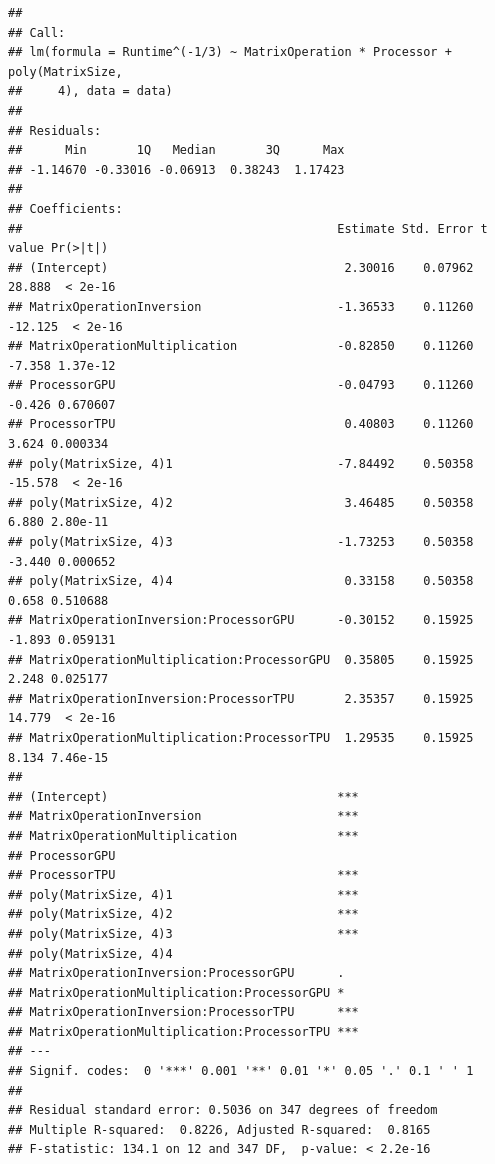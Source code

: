 \documentclass[
]{article}
\newenvironment{Shaded}{\begin{snugshade}}{\end{snugshade}}
\newcommand{\DataTypeTok}[1]{\textcolor[rgb]{0.13,0.29,0.53}{#1}}
\newcommand{\DecValTok}[1]{\textcolor[rgb]{0.00,0.00,0.81}{#1}}
\newcommand{\KeywordTok}[1]{\textcolor[rgb]{0.13,0.29,0.53}{\textbf{#1}}}
\newcommand{\NormalTok}[1]{#1}
\newcommand{\OperatorTok}[1]{\textcolor[rgb]{0.81,0.36,0.00}{\textbf{#1}}}
\newcommand{\StringTok}[1]{\textcolor[rgb]{0.31,0.60,0.02}{#1}}
\begin{document}
\begin{verbatim}
## 
## Call:
## lm(formula = Runtime^(-1/3) ~ MatrixOperation * Processor + poly(MatrixSize, 
##     4), data = data)
## 
## Residuals:
##      Min       1Q   Median       3Q      Max 
## -1.14670 -0.33016 -0.06913  0.38243  1.17423 
## 
## Coefficients:
##                                            Estimate Std. Error t value Pr(>|t|)
## (Intercept)                                 2.30016    0.07962  28.888  < 2e-16
## MatrixOperationInversion                   -1.36533    0.11260 -12.125  < 2e-16
## MatrixOperationMultiplication              -0.82850    0.11260  -7.358 1.37e-12
## ProcessorGPU                               -0.04793    0.11260  -0.426 0.670607
## ProcessorTPU                                0.40803    0.11260   3.624 0.000334
## poly(MatrixSize, 4)1                       -7.84492    0.50358 -15.578  < 2e-16
## poly(MatrixSize, 4)2                        3.46485    0.50358   6.880 2.80e-11
## poly(MatrixSize, 4)3                       -1.73253    0.50358  -3.440 0.000652
## poly(MatrixSize, 4)4                        0.33158    0.50358   0.658 0.510688
## MatrixOperationInversion:ProcessorGPU      -0.30152    0.15925  -1.893 0.059131
## MatrixOperationMultiplication:ProcessorGPU  0.35805    0.15925   2.248 0.025177
## MatrixOperationInversion:ProcessorTPU       2.35357    0.15925  14.779  < 2e-16
## MatrixOperationMultiplication:ProcessorTPU  1.29535    0.15925   8.134 7.46e-15
##                                               
## (Intercept)                                ***
## MatrixOperationInversion                   ***
## MatrixOperationMultiplication              ***
## ProcessorGPU                                  
## ProcessorTPU                               ***
## poly(MatrixSize, 4)1                       ***
## poly(MatrixSize, 4)2                       ***
## poly(MatrixSize, 4)3                       ***
## poly(MatrixSize, 4)4                          
## MatrixOperationInversion:ProcessorGPU      .  
## MatrixOperationMultiplication:ProcessorGPU *  
## MatrixOperationInversion:ProcessorTPU      ***
## MatrixOperationMultiplication:ProcessorTPU ***
## ---
## Signif. codes:  0 '***' 0.001 '**' 0.01 '*' 0.05 '.' 0.1 ' ' 1
## 
## Residual standard error: 0.5036 on 347 degrees of freedom
## Multiple R-squared:  0.8226, Adjusted R-squared:  0.8165 
## F-statistic: 134.1 on 12 and 347 DF,  p-value: < 2.2e-16
\end{verbatim}

\begin{Shaded}
\end{Shaded}
\end{document}
